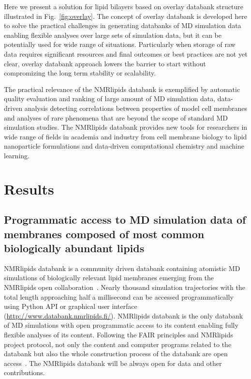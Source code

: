 \documentclass[fleqn,10pt]{wlscirep}
\begin{document}
Here we present a solution for lipid bilayers based on overlay databank structure illustrated in Fig.~\ref{fig:overlay}.  The concept of overlay databank is developed here to solve the practical challenges in generating databanks of MD simulation data enabling flexible analyses over large sets of simulation data, but it can be  potentially used for wide range of situations. Particularly when storage of raw data requires significant resources and final outcomes or best practices are not yet clear, overlay databank approach lowers the barrier to start without compromizing the long term stability or scalability.

The practical relevance of the NMRlipids databank is exemplified by automatic quality evaluation and ranking of large amount of MD simulation data, data-driven analysis detecting correlations between properties of model cell membranes and analyses of rare phenomena that are beyond the scope of standard MD simulation studies. The NMRlipids databank provides new tools for researchers in wide range of fields in academia and industry from cell membrane biology to lipid nanoparticle formulations and data-driven computational chemistry and machine learning. 


\section{Results}

\subsection{Programmatic access to MD simulation data of membranes composed of most common biologically abundant lipids}
NMRlipids databank is a community driven databank containing atomistic MD simulations of biologically relevant lipid membranes emerging from the NMRlipids open collaboration~\cite{botan15,ollila16,catte16,antila19,bacle21}. Nearly thousand simulation trajectories with the total length approaching half a millisecond can be accessed programmatically using Python API or graphical user interface (\url{http://www.databank.nmrlipids.fi/}). NMRlipids databank is the only databank of MD simulations with open programmatic access to its content enabling fully flexible analyses of its content. Following the FAIR principles and NMRlipids project protocol, not only the content and computer programs related to the databank but also the whole construction process of the databank are open access~\cite{botan15}. The NMRlipids databank will be always open for data and other contributions.
\end{document}
